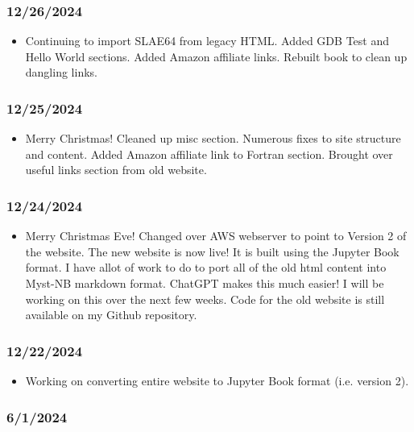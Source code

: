 \subsubsection{12/26/2024}

\begin{itemize}
\item Continuing to import SLAE64 from legacy HTML.  Added GDB Test and Hello World sections.  Added Amazon affiliate links.  Rebuilt book to clean up dangling links.
\end{itemize}

\subsubsection{12/25/2024}

\begin{itemize}
\item Merry Christmas! Cleaned up misc section.  Numerous fixes to site structure and content.  Added Amazon affiliate link to Fortran section.  Brought over useful links section from old website.
\end{itemize}

\subsubsection{12/24/2024}

\begin{itemize}
\item Merry Christmas Eve! Changed over AWS webserver to point to Version 2 of the website.  The new website is now live!  It is built using the Jupyter Book format.  I have allot of work to do to port all of the old html content into Myst-NB markdown format.  ChatGPT makes this much easier!  I will be working on this over the next few weeks.  Code for the old website is still available on my Github repository.
\end{itemize}

\subsubsection{12/22/2024}

\begin{itemize}
\item Working on converting entire website to Jupyter Book format (i.e. version 2).
\end{itemize}

\subsubsection{6/1/2024}


